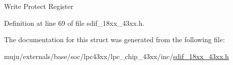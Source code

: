 Write Protect Register 

Definition at line 69 of file sdif\+\_\+18xx\+\_\+43xx.\+h.



The documentation for this struct was generated from the following file\+:\begin{DoxyCompactItemize}
\item 
muju/externals/base/soc/lpc43xx/lpc\+\_\+chip\+\_\+43xx/inc/\hyperlink{sdif__18xx__43xx_8h}{sdif\+\_\+18xx\+\_\+43xx.\+h}\end{DoxyCompactItemize}
